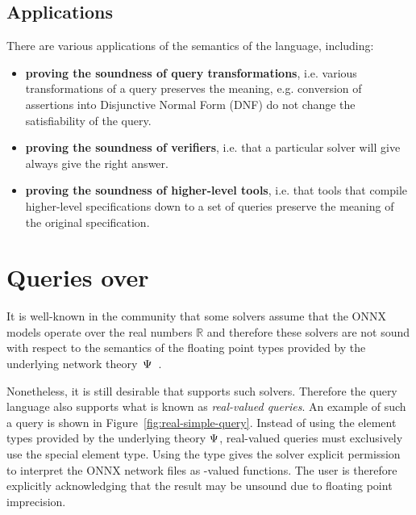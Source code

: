\subsection{Applications}

There are various applications of the semantics of the language, including:
\begin{itemize}
\item \textbf{proving the soundness of query transformations}, i.e. various transformations of a query preserves the meaning, e.g. conversion of assertions into Disjunctive Normal Form (DNF) do not change the satisfiability of the query. 
\item \textbf{proving the soundness of verifiers}, i.e. that a particular solver will give always give the right answer.
\item \textbf{proving the soundness of higher-level tools}, i.e. that tools that compile higher-level specifications down to a set of \vnnlib{} queries preserve the meaning of the original specification.
\end{itemize}


\section{Queries over \real}
\label{sec:real-queries}

It is well-known in the community that some solvers assume that the ONNX models operate over the real numbers $\mathbb{R}$ and therefore these solvers are not sound with respect to the semantics of the floating point types provided by the underlying network theory~$\Psi$~\cite{jia2021exploiting}. 

Nonetheless, it is still desirable that \vnnlib{} supports such solvers. Therefore the \vnnlib{} query language also supports what is known as \emph{real-valued queries}. An example of such a query is shown in Figure~\ref{fig:real-simple-query}. Instead of using the element types provided by the underlying theory $\Psi$, real-valued queries must exclusively use the special  element type. 
Using the  type gives the solver explicit permission to interpret the ONNX network files as \real{}-valued functions. The user is therefore explicitly acknowledging that the result may be unsound due to floating point imprecision. 

